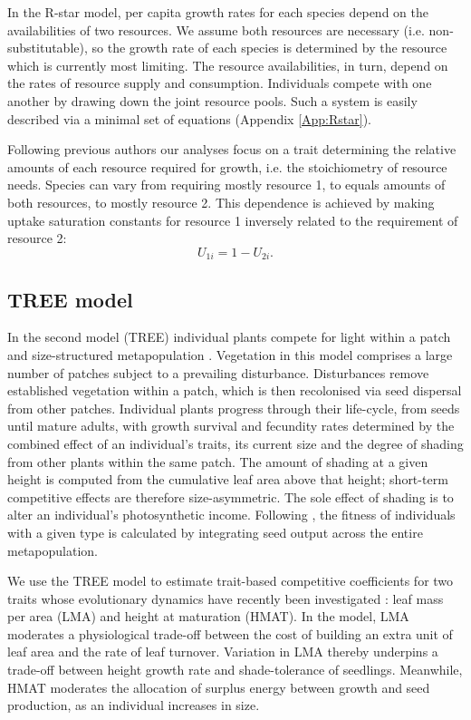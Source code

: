 \documentclass[a4paper,11pt]{article}
\begin{document}
\begin{itemize}
In the R-star model, per capita growth rates for each species depend on the
availabilities of two resources. We assume both resources are necessary (i.e.
non-substitutable), so the growth rate of each species is determined by the
resource which is currently most limiting. The resource availabilities, in
turn, depend on  the rates of resource supply and consumption. Individuals
compete with one another by drawing down the joint resource pools. Such a
system is easily described via a minimal set of equations (Appendix
\ref{App:Rstar}).

Following previous authors \citep{Tilman-1985, Schreiber-2003, Fox-2008} our
analyses focus on a trait determining the relative amounts of each resource
required for growth, i.e. the stoichiometry of resource needs. Species can
vary from requiring mostly resource 1, to equals amounts of both resources, to
mostly resource 2. This dependence is achieved by making uptake saturation
constants for resource 1 inversely related to the requirement of resource 2:
\begin{equation}
\label{eq:R3}
U_{1i} = 1-U_{2i}.
\end{equation}

\subsection{TREE model}

In the second model (TREE) individual plants compete for light within a patch
and size-structured metapopulation \citet{Falster-2011, Falster-2015}.
Vegetation in this model comprises a large number of patches subject to a
prevailing disturbance. Disturbances remove established vegetation within a
patch, which is then recolonised via seed dispersal from other patches.
Individual plants progress through their life-cycle, from seeds until mature
adults, with growth survival and fecundity rates determined by the combined
effect of an individual's traits, its current size and the degree of shading
from other plants within the same patch. The amount of shading at a given
height is computed from the cumulative leaf area above that height; short-term
competitive effects are therefore size-asymmetric. The sole effect of shading
is to alter an individual's photosynthetic income. Following
\citep{Falster-2015}, the fitness of individuals with a given type is
calculated by integrating seed output across the entire metapopulation.

We use the TREE model to estimate trait-based competitive coefficients for
two traits whose evolutionary dynamics have recently been investigated
\citet{Falster-2015}: leaf mass per area (LMA) and height at maturation
(HMAT). In the model, LMA moderates a physiological trade-off between the cost
of building an extra unit of leaf area and the rate of leaf turnover.
Variation in LMA thereby underpins a trade-off between height growth rate and
shade-tolerance of seedlings. Meanwhile, HMAT moderates the allocation of
surplus energy between growth and seed production, as an individual increases in
size.


\end{itemize}
\end{document}

